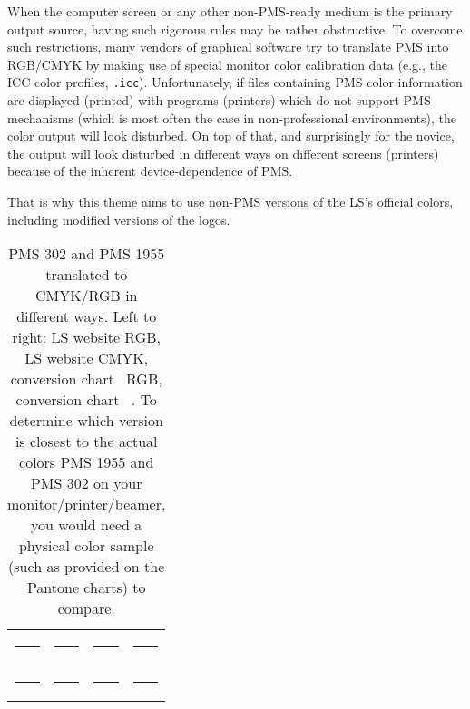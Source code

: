 When the computer screen or any other non-PMS-ready medium is the primary
output source, having such rigorous rules may be rather obstructive. To
overcome such restrictions, many vendors of graphical software try to translate
PMS into RGB/CMYK by making use of special monitor color calibration data
(e.g., the ICC color profiles, \lstinline!.icc!). Unfortunately, if files
containing PMS color information are displayed (printed) with programs
(printers) which do not support PMS mechanisms (which is most often the case in
non-professional environments), the color output will look disturbed. On top of
that, and surprisingly for the novice, the output will look disturbed in
different ways on different screens (printers) because of the inherent
device-dependence of PMS.

That is why this theme aims to use non-PMS versions of the LS's official
colors, including modified versions of the logos.

\begin{table}
\centering
\newlength{\boxsize}
\setlength{\boxsize}{2cm}

\begin{tabular}{cccc}
\definecolor{lsblue11}{RGB}{  0, 61,100}
\colorbox{lsblue11}{\rule{0mm}{\boxsize}\rule{\boxsize}{0mm}}
&
\definecolor{lsblue12}{cmyk}{1,0.3,0,0.62}
\colorbox{lsblue12}{\rule{0mm}{\boxsize}\rule{\boxsize}{0mm}}
&
\definecolor{lsblue13}{RGB}{0,96,128}
\colorbox{lsblue13}{\rule{0mm}{\boxsize}\rule{\boxsize}{0mm}}
&
\definecolor{lsblue14}{cmyk}{1,0.25,0,0.5}
\colorbox{lsblue14}{\rule{0mm}{\boxsize}\rule{\boxsize}{0mm}}\\[2mm]
\definecolor{lsred11}{RGB}{126,  0, 47}
\colorbox{lsred11}{\rule{0mm}{\boxsize}\rule{\boxsize}{0mm}}
&
\definecolor{lsred11}{cmyk}{0,1,0.54,0.46}
\colorbox{lsred11}{\rule{0mm}{\boxsize}\rule{\boxsize}{0mm}}
&
\definecolor{lsred11}{RGB}{161,0,64}
\colorbox{lsred11}{\rule{0mm}{\boxsize}\rule{\boxsize}{0mm}}
&
\definecolor{lsred11}{cmyk}{0,1,0.6,0.37}
\colorbox{lsred11}{\rule{0mm}{\boxsize}\rule{\boxsize}{0mm}}
\end{tabular}

\caption{PMS 302 and PMS 1955 translated to CMYK/RGB in different ways. Left to
right: LS website \cite{KAN::} RGB, LS website \cite{KAN::} CMYK, conversion
chart~\cite{::TDC} RGB, conversion chart~\cite{::TDC} \@CMYK. To determine which
version is closest to the actual colors PMS 1955 and PMS 302 on your
monitor/printer/beamer, you would need a physical color sample (such as
provided on the Pantone\textsuperscript{\textregistered} charts) to compare.}
\label{table:reds-blues}
\end{table}

